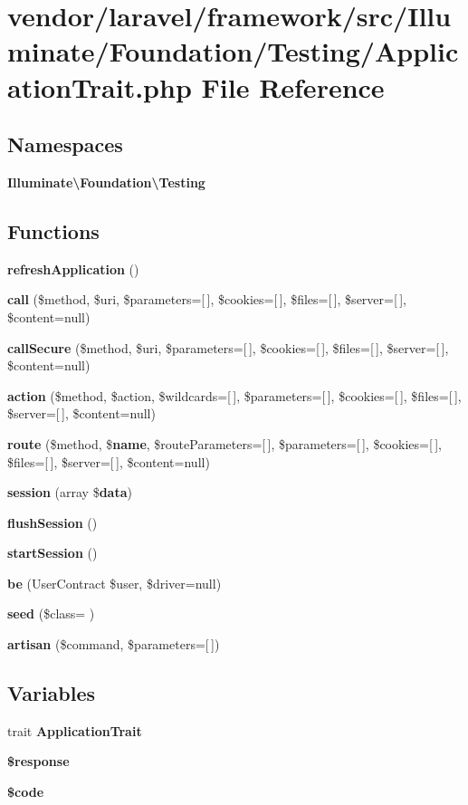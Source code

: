 \section{vendor/laravel/framework/src/\+Illuminate/\+Foundation/\+Testing/\+Application\+Trait.php File Reference}
\label{_application_trait_8php}
\subsection*{Namespaces}
\begin{DoxyCompactItemize}
\item 
 {\bf Illuminate\textbackslash{}\+Foundation\textbackslash{}\+Testing}
\end{DoxyCompactItemize}
\subsection*{Functions}
\begin{DoxyCompactItemize}
\item 
{\bf refresh\+Application} ()
\item 
{\bf call} (\$method, \$uri, \$parameters=[$\,$], \$cookies=[$\,$], \$files=[$\,$], \$server=[$\,$], \$content=null)
\item 
{\bf call\+Secure} (\$method, \$uri, \$parameters=[$\,$], \$cookies=[$\,$], \$files=[$\,$], \$server=[$\,$], \$content=null)
\item 
{\bf action} (\$method, \$action, \$wildcards=[$\,$], \$parameters=[$\,$], \$cookies=[$\,$], \$files=[$\,$], \$server=[$\,$], \$content=null)
\item 
{\bf route} (\$method, \${\bf name}, \$route\+Parameters=[$\,$], \$parameters=[$\,$], \$cookies=[$\,$], \$files=[$\,$], \$server=[$\,$], \$content=null)
\item 
{\bf session} (array \${\bf data})
\item 
{\bf flush\+Session} ()
\item 
{\bf start\+Session} ()
\item 
{\bf be} (User\+Contract \$user, \$driver=null)
\item 
{\bf seed} (\$class= \textquotesingle{})
\item 
{\bf artisan} (\$command, \$parameters=[$\,$])
\end{DoxyCompactItemize}
\subsection*{Variables}
\begin{DoxyCompactItemize}
\item 
trait {\bf Application\+Trait}
\item 
{\bf \$response}
\item 
{\bf \$code}
\end{DoxyCompactItemize}
